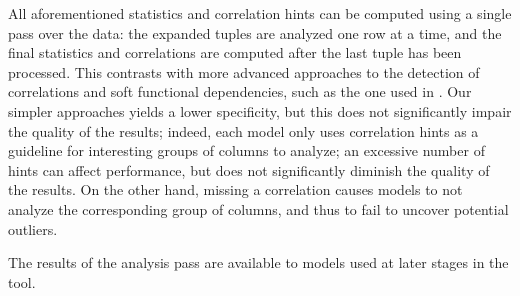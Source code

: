All aforementioned statistics and correlation hints can be computed using a single pass over the data: the expanded tuples are analyzed one row at a time, and the final statistics and correlations are computed after the last tuple has been processed. This contrasts with more advanced approaches to the detection of correlations and soft functional dependencies, such as the one used in \cite{Ilyas2004}. Our simpler approaches yields a lower specificity, but this does not significantly impair the quality of the results; indeed, each model only uses correlation hints as a guideline for interesting groups of columns to analyze; an excessive number of hints can affect performance, but does not significantly diminish the quality of the results. On the other hand, missing a correlation causes models to not analyze the corresponding group of columns, and thus to fail to uncover potential outliers.

The results of the analysis pass are available to models used at later stages in the tool.
